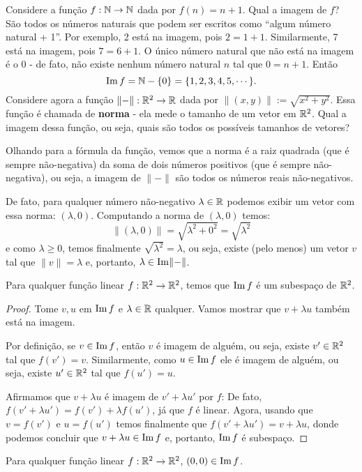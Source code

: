 \begin{ex}
	Considere a função $f:\mathbb N\to \mathbb N$ dada por $f(n)=n+1$. Qual a imagem de $f$? São todos os números naturais que podem ser escritos como ``algum número natural + 1''. Por exemplo, 2 está na imagem, pois $2=1+1$. Similarmente, 7 está na imagem, pois $7=6+1$. O único número natural que não está na imagem é o 0 - de fato, não existe nenhum número natural $n$ tal que $0=n+1$. Então
	\[\operatorname{Im} f=\mathbb N-\{0\}=\{1,2,3,4,5,\cdots\}.\]
	\tcblower
	Considere agora a função $\lVert-\rVert:\mathbb R^2\to \mathbb R$ dada por $\lVert(x,y)\rVert:=\sqrt{x^2+y^2}$. Essa função é chamada de \textbf{norma} - ela mede o tamanho de um vetor em $\mathbb R^2$. Qual a imagem dessa função, ou seja, quais são todos os possíveis tamanhos de vetores?
	
	Olhando para a fórmula da função, vemos que a norma é a raiz quadrada (que é sempre não-negativa) da soma de dois números positivos (que é sempre não-negativa), ou seja, a imagem de $\lVert-\rVert$ são todos os números reais não-negativos.
	
	De fato, para qualquer número não-negativo $\lambda\in\mathbb R$ podemos exibir um vetor com essa norma: $(\lambda,0)$. Computando a norma de $(\lambda,0)$ temos:
	\[\lVert(\lambda,0)\rVert=\sqrt{\lambda^2+0^2}=\sqrt{\lambda^2}\]e como $\lambda\geq0$, temos finalmente $\sqrt{\lambda^2}=\lambda$, ou seja, existe (pelo menos) um vetor $v$ tal que $\lVert v\rVert=\lambda$ e, portanto, $\lambda\in\operatorname{Im} \lVert-\rVert$.
\end{ex}

\begin{prop}
	Para qualquer função linear $f:\mathbb R^2\to \mathbb R^2$, temos que $\operatorname{Im} f$ é um subespaço de $\mathbb R^2$.
\end{prop}
\begin{proof}
	Tome $v,u$ em $\operatorname{Im} f$ e $\lambda\in \mathbb R$ qualquer. Vamos mostrar que $v+\lambda u$ também está na imagem.
	
	Por definição, se $v\in\operatorname{Im} f$, então $v$ é imagem de alguém, ou seja, existe $v'\in\mathbb R^2$ tal que $f(v')=v$. Similarmente, como $u\in\operatorname{Im} f$ ele é imagem de alguém, ou seja, existe $u'\in\mathbb R^2$ tal que $f(u')=u$.
	
	Afirmamos que $v+\lambda u$ é imagem de $v'+\lambda u'$ por $f$: De fato, \(f(v'+\lambda u')=f(v')+\lambda f(u')\), já que $f$ é linear. Agora, usando que $v=f(v')$ e $u=f(u')$ temos finalmente que $f(v'+\lambda u')=v+\lambda u$, donde podemos concluir que $v+\lambda u\in\operatorname{Im} f$ e, portanto, $\operatorname{Im} f$ é subespaço.
\end{proof}
\begin{cor}
	Para qualquer função linear $f:\mathbb R^2\to\mathbb R^2$, $(0,0)\in\operatorname{Im} f$.
\end{cor}


